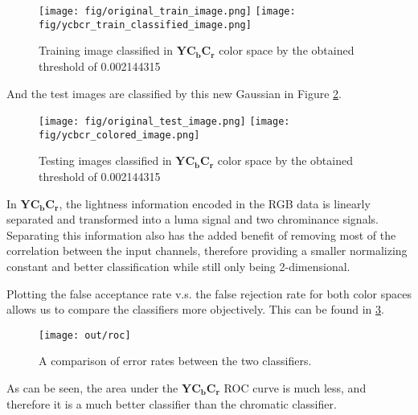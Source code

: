 \documentclass[headings=optiontoheadandtoc,listof=totoc,parskip=full]{scrartcl}
\begin{document}
%
\begin{figure}[H]
    \centering
    \texttt{[image: fig/original\_train\_image.png]}
    \texttt{[image: fig/ycbcr\_train\_classified\_image.png]}
    \caption{Training image classified in $\mathbf{YC_bC_r}$ color space by the obtained threshold of 0.002144315}
    \label{fig:ycbcr_train_classified_image}
\end{figure}

And the test images are classified by this new Gaussian in Figure \ref{fig:ycbcr_colored_image}.

%
\begin{figure}[H]
    \centering
    \texttt{[image: fig/original\_test\_image.png]}
    \texttt{[image: fig/ycbcr\_colored\_image.png]}
    \caption{Testing images classified in $\mathbf{YC_bC_r}$ color space by the obtained threshold of 0.002144315}
    \label{fig:ycbcr_colored_image}
\end{figure}

In $\mathbf{YC_bC_r}$, the lightness information encoded in the RGB data is linearly separated and transformed into a luma signal and two chrominance signals. Separating this information also has the added benefit of removing most of the correlation between the input channels, therefore providing a smaller normalizing constant and better classification while still only being 2-dimensional.

Plotting the false acceptance rate v.s. the false rejection rate for both color spaces allows us to compare the classifiers more objectively. This can be found in \cref{fig:roc-compare}.

\begin{figure}[H]
    \centering
    \texttt{[image: out/roc]}
    \caption{A comparison of error rates between the two classifiers.}
    \label{fig:roc-compare}
\end{figure}

As can be seen, the area under the $\mathbf{YC_bC_r}$ ROC curve is much less, and therefore it is a much better classifier than the chromatic classifier.
\end{document}

